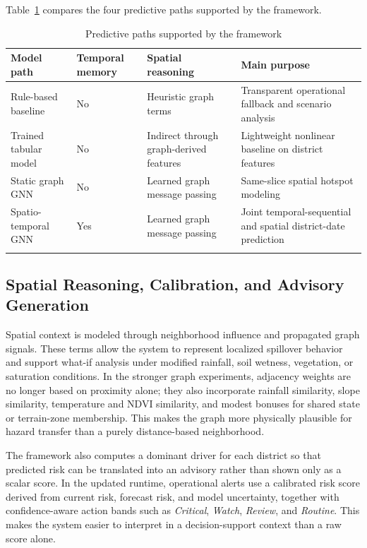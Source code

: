 \documentclass[pdflatex,sn-mathphys-num]{sn-jnl}
\begin{document}
Table~\ref{tab:model_paths} compares the four predictive paths supported by the framework.

\begin{table}[h]
\caption{Predictive paths supported by the framework}
\label{tab:model_paths}
\begin{tabular}{@{}p{3.1cm}p{2.2cm}p{2.0cm}p{5.4cm}@{}}
\toprule
Model path & Temporal memory & Spatial reasoning & Main purpose \\
\midrule
Rule-based baseline & No & Heuristic graph terms & Transparent operational fallback and scenario analysis \\
Trained tabular model & No & Indirect through graph-derived features & Lightweight nonlinear baseline on district features \\
Static graph GNN & No & Learned graph message passing & Same-slice spatial hotspot modeling \\
Spatio-temporal GNN & Yes & Learned graph message passing & Joint temporal-sequential and spatial district-date prediction \\
\botrule
\end{tabular}
\end{table}

\subsection{Spatial Reasoning, Calibration, and Advisory Generation}

Spatial context is modeled through neighborhood influence and propagated graph signals. These terms allow the system to represent localized spillover behavior and support what-if analysis under modified rainfall, soil wetness, vegetation, or saturation conditions. In the stronger graph experiments, adjacency weights are no longer based on proximity alone; they also incorporate rainfall similarity, slope similarity, temperature and NDVI similarity, and modest bonuses for shared state or terrain-zone membership. This makes the graph more physically plausible for hazard transfer than a purely distance-based neighborhood.

The framework also computes a dominant driver for each district so that predicted risk can be translated into an advisory rather than shown only as a scalar score. In the updated runtime, operational alerts use a calibrated risk score derived from current risk, forecast risk, and model uncertainty, together with confidence-aware action bands such as \emph{Critical}, \emph{Watch}, \emph{Review}, and \emph{Routine}. This makes the system easier to interpret in a decision-support context than a raw score alone.
\end{document}
